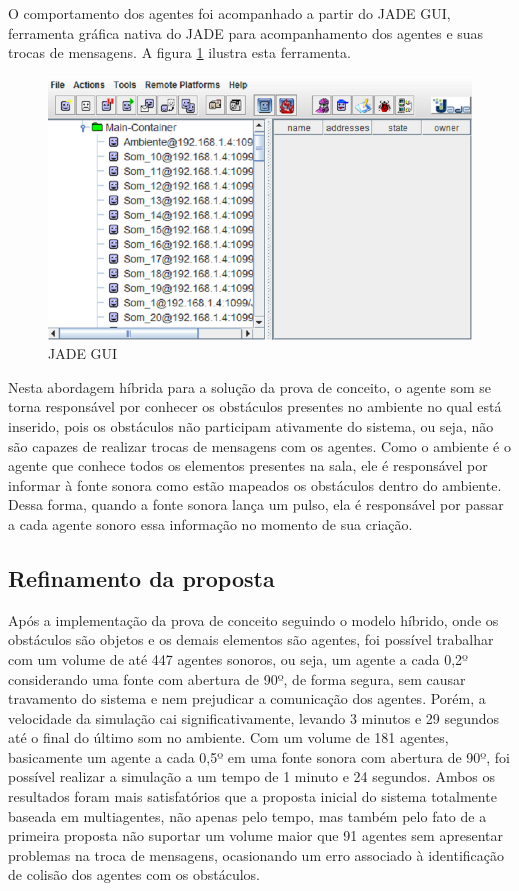 O comportamento dos agentes foi acompanhado a partir do JADE GUI, ferramenta gráfica nativa do JADE para acompanhamento dos agentes e suas trocas de mensagens. A figura \ref{jade_gui} ilustra esta ferramenta. 

\FloatBarrier 
\begin{figure}[!htb]
\centering
\includegraphics[scale=0.55]{figuras/jade_gui}
\caption{JADE GUI}
\label{jade_gui}
\end{figure}

Nesta abordagem híbrida para a solução da prova de conceito, o agente som se torna responsável por conhecer os obstáculos presentes no ambiente no qual está inserido, pois os obstáculos não participam ativamente do sistema, ou seja, não são capazes de realizar trocas de mensagens com os agentes. Como o ambiente é o agente que conhece todos os elementos presentes na sala, ele é responsável por informar à fonte sonora como estão mapeados os obstáculos dentro do ambiente. Dessa forma, quando a fonte sonora lança um pulso, ela é responsável por passar a cada agente sonoro essa informação no momento de sua criação.

\subsection{Refinamento da proposta}

Após a implementação da prova de conceito seguindo o modelo híbrido, onde os obstáculos são objetos e os demais elementos são agentes, foi possível trabalhar com um volume de até 447 agentes sonoros, ou seja, um agente a cada 0,2º considerando uma fonte com abertura de 90º, de forma segura, sem causar travamento do sistema e nem prejudicar a comunicação dos agentes. Porém, a velocidade da simulação cai significativamente, levando 3 minutos e 29 segundos até o final do último som no ambiente. Com um volume de 181 agentes, basicamente um agente a cada 0,5º em uma fonte sonora com abertura de 90º, foi possível realizar a simulação a um tempo de 1 minuto e 24 segundos. Ambos os resultados foram mais satisfatórios que a proposta inicial do sistema totalmente baseada em multiagentes, não apenas pelo tempo, mas também pelo fato de a primeira proposta não suportar um volume maior que 91 agentes sem apresentar problemas na troca de mensagens, ocasionando um erro associado à identificação de colisão dos agentes com os obstáculos.

